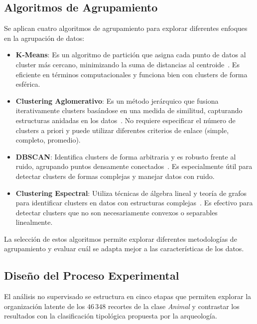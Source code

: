 \subsection{Algoritmos de Agrupamiento}

Se aplican cuatro algoritmos de agrupamiento para explorar diferentes enfoques en la agrupación de datos:

\begin{itemize}
    \item \textbf{K-Means}:
    Es un algoritmo de partición que asigna cada punto de datos al cluster más cercano, minimizando la suma de distancias al centroide~\cite{macqueen1967some}.
    Es eficiente en términos computacionales y funciona bien con clusters de forma esférica.
    \item \textbf{Clustering Aglomerativo}:
    Es un método jerárquico que fusiona iterativamente clusters basándose en una medida de similitud, capturando estructuras anidadas en los datos~\cite{rokach2005clustering}.
    No requiere especificar el número de clusters a priori y puede utilizar diferentes criterios de enlace (simple, completo, promedio).
    \item \textbf{DBSCAN}:
    Identifica clusters de forma arbitraria y es robusto frente al ruido, agrupando puntos densamente conectados~\cite{ester1996density}.
    Es especialmente útil para detectar clusters de formas complejas y manejar datos con ruido.
    \item \textbf{Clustering Espectral}:
    Utiliza técnicas de álgebra lineal y teoría de grafos para identificar clusters en datos con estructuras complejas~\cite{ng2002spectral}.
    Es efectivo para detectar clusters que no son necesariamente convexos o separables linealmente.
\end{itemize}

La selección de estos algoritmos permite explorar diferentes metodologías de agrupamiento y evaluar cuál se adapta mejor a las características de los datos.

\subsection{Diseño del Proceso Experimental}\label{sec:unsup_design}

El análisis no supervisado se estructura en cinco etapas que permiten explorar la organización latente de los \(46\,348\) recortes de la clase \textit{Animal} y contrastar los resultados con la clasificación tipológica propuesta por la arqueología.

